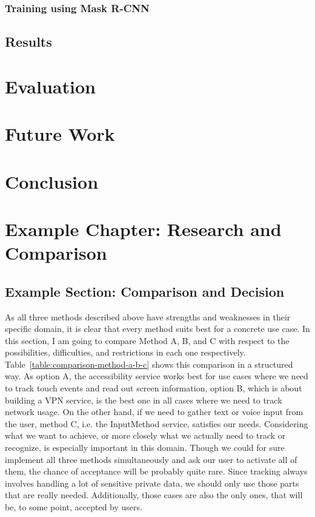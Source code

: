 \subsection{Training using Mask R-CNN}

\section{Results}

\chapter{Evaluation}
\label{ch:evaluation}

\chapter{Future Work}
\label{ch:future-work}

\chapter{Conclusion}
\label{ch:conclusion}

\chapter{Example Chapter: Research and Comparison}

\section{Example Section: Comparison and Decision}
\label{sec:comparison}

As all three methods described above have strengths and weaknesses in their specific domain, it is clear that every method suits best for a concrete use case. In this section, I am going to compare Method A, B, and C with respect to the possibilities, difficulties, and restrictions in each one respectively. Table~\ref{table:comparison-method-a-b-c} shows this comparison in a structured way. As option A, the accessibility service works best for use cases where we need to track touch events and read out screen information, option B, which is about building a VPN service, is the best one in all cases where we need to track network usage. On the other hand, if we need to gather text or voice input from the user, method C, i.e. the InputMethod service, satisfies our needs. Considering what we want to achieve, or more closely what we actually need to track or recognize, is especially important in this domain. Though we could for sure implement all three methods simultaneously and ask our user to activate all of them, the chance of acceptance will be probably quite rare. Since tracking always involves handling a lot of sensitive private data, we should only use those parts that are really needed. Additionally, those cases are also the only ones, that will be, to some point, accepted by users.

